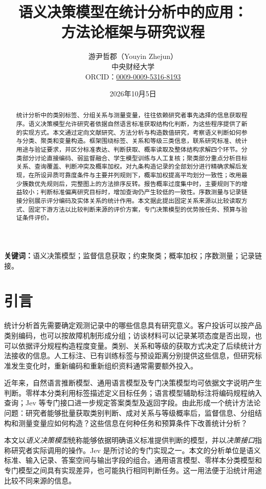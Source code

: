 \documentclass[UTF8,a4paper,zihao=-4,fontset=fandol]{ctexart}
\title{\bfseries 语义决策模型在统计分析中的应用：\\方法论框架与研究议程}
\author{游尹哲郡（Youyin Zhejun）\\[0.3em]
\small 中央财经大学\\
\small ORCID：\href{https://orcid.org/0009-0009-5316-8193}{0009-0009-5316-8193}}
\date{2026年10月5日}
\begin{document}
\maketitle
\thispagestyle{plain}
\begin{abstract}
统计分析中的类别标签、分组关系与测量变量，往往依赖研究者事先选择的信息获取程序。语义决策模型允许研究者依据自然语言标准获取结构化判断，为这些程序提供了新的实现方式。本文通过定向文献研究、方法分析与构造数值研究，考察语义判断如何参与分类、聚类和变量构造。框架围绕标签、关系和等级三类信息，联系研究标准、统计用途与验证要求，并区分标准表达、判断获取、概率读取及整体结构求解四个环节。分类部分讨论直接编码、弱监督融合、学生模型训练与人工复核；聚类部分重点分析目标关系、查询覆盖、判断冲突及概率加权。对九条构造记录的全部划分进行精确求解后发现，在所设异质可靠度条件与主要并列规则下，概率加权提高平均划分一致性；改用最少簇数优先规则后，完整图上的方法排序反转。报告概率过度集中时，主要规则下的增益较小；判断标准偏离研究目标时，增加查询仍产生较低的一致性。序数测量与记录链接分别展示评分编码及实体关系的统计作用。本文据此提出固定关系来源以比较读取方式、固定下游方法以比较判断来源的评价方案，专门决策模型的优势按任务、预算与验证条件评价。
\end{abstract}
\noindent\textbf{关键词：}语义决策模型；监督信息获取；约束聚类；概率加权；序数测量；记录链接。

\section{引言}\label{sec:intro}

统计分析首先需要确定观测记录中的哪些信息具有研究意义。客户投诉可以按产品类别编码，也可以按故障机制形成分组；访谈材料可以记录某项态度是否出现，也可以依据评分规程构造程度变量。类别、关系和等级的获取方式决定了后续统计方法接收的信息。人工标注、已有训练标签与预设距离分别提供这些信息，但研究标准发生变化时，重新编码和重新组织资料通常需要额外投入。

近年来，自然语言推断模型、通用语言模型及专门决策模型均可依据文字说明产生判断。零样本分类利用标签描述定义目标任务；语言模型辅助标注将编码规程纳入查询；Jev 等专门接口进一步规定答案类型及返回字段\citep{yin2019,tan2024,typesafe-intro}。由此形成一个统计方法论问题：研究者能够批量获取类别判断、成对关系与等级概率后，监督信息、分组结构和测量变量应如何构造？这些信息在何种任务和预算条件下改善统计分析？

本文以\emph{语义决策模型}统称能够依据明确语义标准提供判断的模型，并以\emph{决策接口}指称研究者实际调用的操作。Jev 是所讨论的专门实现之一。本文的分析单位是语义标准、输入记录、答案空间与输出字段的组合。通用语言模型、零样本分类模型和专门模型之间具有实现差异，也可能执行相同判断任务。这一用法便于沿统计用途比较不同来源的信息。
\end{document}
